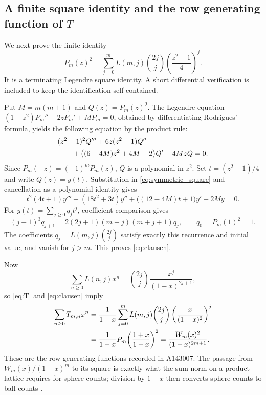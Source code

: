 \documentclass[11pt,letterpaper]{article}
\numberwithin{equation}{section}
\theoremstyle{definition}
\begin{document}
\subsection{A finite square identity and the row generating function of \texorpdfstring{$T$}{T}}

We next prove the finite identity
\begin{equation}\label{eq:clausen}
 P_m(z)^2=\sum_{j=0}^{m}L(m,j)\binom{2j}{j}
       \left(\frac{z^2-1}{4}\right)^j.
\end{equation}
It is a terminating Legendre square identity. A short differential
verification is included to keep the identification self-contained.

Put $M=m(m+1)$ and $Q(z)=P_m(z)^2$. The Legendre equation
$(1-z^2)P_m''-2zP_m'+MP_m=0$, obtained by differentiating Rodrigues'
formula, yields the following equation by the product rule:
\begin{align}
 &(z^2-1)^2Q'''+6z(z^2-1)Q''\notag\\
 &\qquad+\bigl((6-4M)z^2+4M-2\bigr)Q'-4MzQ=0.\label{eq:symmetric_square}
\end{align}
Since $P_m(-z)=(-1)^mP_m(z)$, $Q$ is a polynomial in $z^2$.
Set $t=(z^2-1)/4$ and write $Q(z)=y(t)$. Substitution in
\eqref{eq:symmetric_square} and cancellation as a polynomial identity
gives
\begin{equation}\label{eq:yode}
 t^2(4t+1)y'''+(18t^2+3t)y''+
 \bigl((12-4M)t+1\bigr)y'-2My=0.
\end{equation}
For $y(t)=\sum_{j\geq0}q_jt^j$, coefficient comparison gives
\[
 (j+1)^3q_{j+1}=2(2j+1)(m-j)(m+j+1)q_j,
 \qquad q_0=P_m(1)^2=1.
\]
The coefficients $q_j=L(m,j)\binom{2j}{j}$ satisfy exactly this
recurrence and initial value, and vanish for $j>m$. This proves
\eqref{eq:clausen}.

Now
\[
 \sum_{n\geq0}L(n,j)x^n
 =\binom{2j}{j}\frac{x^j}{(1-x)^{2j+1}},
\]
so \eqref{eq:T} and \eqref{eq:clausen} imply
\begin{align}
 \sum_{n\geq0}T_{m,n}x^n
 &=\frac1{1-x}\sum_{j=0}^{m}L(m,j)\binom{2j}{j}
        \left(\frac{x}{(1-x)^2}\right)^j\notag\\
 &=\frac1{1-x}P_m\!\left(\frac{1+x}{1-x}\right)^2
 =\frac{W_m(x)^2}{(1-x)^{2m+1}}.\label{eq:Tgf}
\end{align}
These are the row generating functions recorded in A143007.
The passage from $W_m(x)/(1-x)^m$ to its square is exactly what the
sum norm on a product lattice requires for sphere counts; division by
$1-x$ then converts sphere counts to ball counts
\cite{oeis143007,bacher}.
\end{document}
